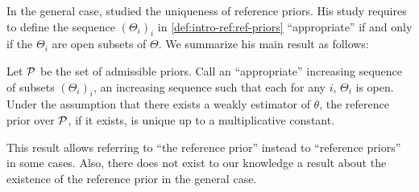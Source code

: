 








In the general case, \citet{mure_objective_2018} studied the uniqueness of reference priors. 
His study requires to define the sequence $(\Theta_i)_i$ in \cref{def:intro-ref:ref-priors} ``appropriate'' if and only if the $\Theta_i$ are open subsets of $\Theta$.
%
We summarize his main result as follows:
\begin{thm}
    Let $\mathcal{P}$ be the set of admissible priors. 
    Call an ``appropriate'' increasing sequence of subsets $(\Theta_i)_i$, an increasing sequence such that each for any $i$, $\Theta_i$ is open.
    Under the assumption that there exists a weakly estimator of $\theta$, the reference prior over $\mathcal{P}$, if it exists, is unique up to a multiplicative constant.
\end{thm}

This result allows referring to ``the reference prior'' instead to ``reference priors'' in some cases. %
Also, there does not exist to our knowledge a result about the existence of the reference prior in the general case.


